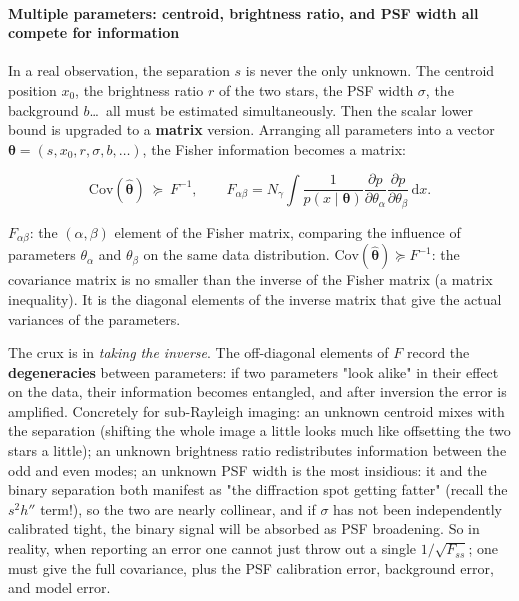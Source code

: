 \paragraph{Multiple parameters: centroid, brightness ratio, and PSF width all compete for information}
\label{sec:e12-matrix}

In a real observation, the separation $s$ is never the only unknown. The centroid position $x_0$, the brightness ratio $r$ of the two stars, the PSF width $\sigma$, the background $b$\dots\ all must be estimated simultaneously. Then the scalar lower bound is upgraded to a \textbf{matrix} version. Arranging all parameters into a vector $\bm\theta=(s,x_0,r,\sigma,b,\dots)$, the Fisher information becomes a matrix:

\begin{equation}
  \mathrm{Cov}(\hat{\bm\theta})\ \succeq\ F^{-1},
  \qquad
  F_{\alpha\beta}=N_\gamma\int
  \frac{1}{p(x\mid\bm\theta)}
  \frac{\partial p}{\partial\theta_\alpha}
  \frac{\partial p}{\partial\theta_\beta}\,\mathrm{d}x.
  \label{eq:e12-fisher-matrix}
\end{equation}
\begin{formulaexplain}
$F_{\alpha\beta}$: the $(\alpha,\beta)$ element of the Fisher matrix, comparing the influence of parameters $\theta_\alpha$ and $\theta_\beta$ on the same data distribution. $\mathrm{Cov}(\hat{\bm\theta})\succeq F^{-1}$: the covariance matrix is no smaller than the inverse of the Fisher matrix (a matrix inequality). It is the diagonal elements of the inverse matrix that give the actual variances of the parameters.
\end{formulaexplain}

The crux is in \emph{taking the inverse}. The off-diagonal elements of $F$ record the \textbf{degeneracies} between parameters: if two parameters "look alike" in their effect on the data, their information becomes entangled, and after inversion the error is amplified. Concretely for sub-Rayleigh imaging: an unknown centroid mixes with the separation (shifting the whole image a little looks much like offsetting the two stars a little); an unknown brightness ratio redistributes information between the odd and even modes; an unknown PSF width is the most insidious: it and the binary separation both manifest as "the diffraction spot getting fatter" (recall the $s^2 h''$ term!), so the two are nearly collinear, and if $\sigma$ has not been independently calibrated tight, the binary signal will be absorbed as PSF broadening. So in reality, when reporting an error one cannot just throw out a single $1/\sqrt{F_{ss}}$; one must give the full covariance, plus the PSF calibration error, background error, and model error.


